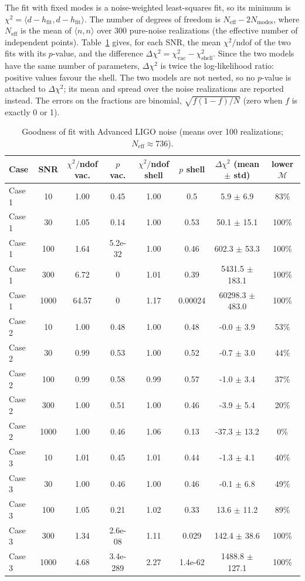 \documentclass[11pt,a4paper]{article}
\begin{document}
The fit with fixed modes is a noise-weighted least-squares fit, so its minimum is
$\chi^2=\langle d-h_\mathrm{fit},d-h_\mathrm{fit}\rangle$. The number of degrees of freedom is
$N_\mathrm{eff}-2N_\mathrm{modes}$, where $N_\mathrm{eff}$ is the mean of $\langle n,n\rangle$ over 300 pure-noise
realizations (the effective number of independent points). Table~\ref{tab:chi2} gives, for each SNR, the mean
$\chi^2/\mathrm{ndof}$ of the two fits with its $p$-value, and the difference $\Delta\chi^2=\chi^2_\mathrm{vac}-
\chi^2_\mathrm{shell}$. Since the two models have the same number of parameters, $\Delta\chi^2$ is twice the
log-likelihood ratio: positive values favour the shell. The two models are not nested, so no $p$-value is attached
to $\Delta\chi^2$; its mean and spread over the noise realizations are reported instead. The errors on the
fractions are binomial, $\sqrt{f(1-f)/N}$ (zero when $f$ is exactly 0 or 1).


\begin{table}[H]
\centering\small
\begin{tabular}{lccccccc}
\toprule
Case & SNR & $\chi^2/$ndof vac. & $p$ vac. & $\chi^2/$ndof shell & $p$ shell & $\Delta\chi^2$ (mean $\pm$ std) & lower $\mathcal{M}$ \\
\midrule
Case 1 & 10 & 1.00 & 0.45 & 1.00 & 0.5 & 5.9 $\pm$ 6.9 & 83\% \\
Case 1 & 30 & 1.05 & 0.14 & 1.00 & 0.53 & 50.1 $\pm$ 15.1 & 100\% \\
Case 1 & 100 & 1.64 & 5.2e-32 & 1.00 & 0.46 & 602.3 $\pm$ 53.3 & 100\% \\
Case 1 & 300 & 6.72 & 0 & 1.01 & 0.39 & 5431.5 $\pm$ 183.1 & 100\% \\
Case 1 & 1000 & 64.57 & 0 & 1.17 & 0.00024 & 60298.3 $\pm$ 483.0 & 100\% \\
Case 2 & 10 & 1.00 & 0.48 & 1.00 & 0.48 & -0.0 $\pm$ 3.9 & 53\% \\
Case 2 & 30 & 0.99 & 0.53 & 1.00 & 0.52 & -0.7 $\pm$ 3.0 & 44\% \\
Case 2 & 100 & 0.99 & 0.58 & 0.99 & 0.57 & -1.0 $\pm$ 3.4 & 37\% \\
Case 2 & 300 & 1.00 & 0.51 & 1.00 & 0.46 & -3.9 $\pm$ 5.4 & 20\% \\
Case 2 & 1000 & 1.00 & 0.46 & 1.06 & 0.13 & -37.3 $\pm$ 13.2 & 0\% \\
Case 3 & 10 & 1.01 & 0.45 & 1.01 & 0.44 & -1.3 $\pm$ 4.1 & 40\% \\
Case 3 & 30 & 1.00 & 0.46 & 1.00 & 0.46 & -0.1 $\pm$ 6.8 & 49\% \\
Case 3 & 100 & 1.05 & 0.21 & 1.02 & 0.33 & 13.6 $\pm$ 11.2 & 89\% \\
Case 3 & 300 & 1.34 & 2.6e-08 & 1.11 & 0.029 & 142.4 $\pm$ 38.6 & 100\% \\
Case 3 & 1000 & 4.68 & 3.4e-289 & 2.27 & 1.4e-62 & 1488.8 $\pm$ 127.1 & 100\% \\
\bottomrule
\end{tabular}
\caption{Goodness of fit with Advanced LIGO noise (means over 100 realizations; $N_\mathrm{eff}\approx736$).\label{tab:chi2}}
\end{table}
\end{document}
